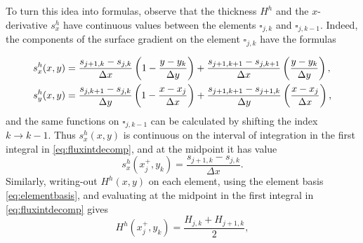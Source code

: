 \documentclass[twocolumn]{igs}
\begin{document}
To turn this idea into formulas, observe that the thickness $H^h$ and the $x$-derivative $s^h_x$ have continuous values between the elements $\square_{j,k}$ and $\square_{j,k-1}$.  Indeed, the components of the surface gradient on the element $\square_{j,k}$ have the formulas
	\begin{comment}
	COMMENT OUT: here is the surface elevation on $\square_{j,k}$
	\begin{align*}
	s^h(x,y) &= s_{j,k} \left(1-\tfrac{x-x_j}{\Delta x}\right) \left(1-\tfrac{y-y_k}{\Delta y}\right)
	    + s_{j+1,k} \left(\tfrac{x-x_j}{\Delta x}\right) \left(1-\tfrac{y-y_k}{\Delta y}\right) \\
	         &\qquad + s_{j,k+1} \left(1-\tfrac{x-x_j}{\Delta x}\right) \left(\tfrac{y-y_k}{\Delta y}\right)
	    + s_{j+1,k+1} \left(\tfrac{x-x_j}{\Delta x}\right) \left(\tfrac{y-y_k}{\Delta y}\right)
	\end{align*}
	\end{comment}
\begin{align}
s^h_x(x,y) &= \frac{s_{j+1,k}-s_{j,k}}{\Delta x} \left(1-\frac{y-y_k}{\Delta y}\right) + \frac{s_{j+1,k+1}-s_{j,k+1}}{\Delta x} \left(\frac{y-y_k}{\Delta y}\right), \label{eq:grads} \\
s^h_y(x,y) &= \frac{s_{j,k+1}-s_{j,k}}{\Delta y} \left(1-\frac{x-x_j}{\Delta x}\right) + \frac{s_{j+1,k+1}-s_{j+1,k}}{\Delta y} \left(\frac{x-x_j}{\Delta x}\right), \notag
\end{align}
and the same functions on $\square_{j,k-1}$ can be calculated by shifting the index $k\to k-1$.  Thus $s^h_x(x,y)$ is continuous on the interval of integration in the first integral in \eqref{eq:fluxintdecomp}, and at the midpoint it has value
\begin{equation}
s^h_x(x_j^+,y_k) = \frac{s_{j+1,k}-s_{j,k}}{\Delta x}. \label{eq:femsxstag}
\end{equation}
Similarly, writing-out $H^h(x,y)$ on each element, using the element basis \eqref{eq:elementbasis}, and evaluating at the midpoint in the first integral in \eqref{eq:fluxintdecomp} gives
\begin{equation}
H^h(x_j^+,y_k) = \frac{H_{j,k}+H_{j+1,k}}{2}, \label{eq:femHstag}
\end{equation}
\end{document}
